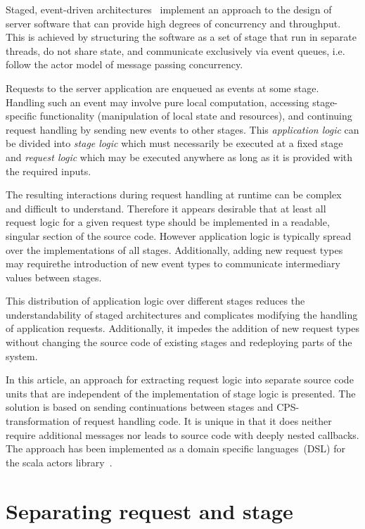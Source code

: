 \documentclass{sig-alternate}
\begin{document}
Staged, event-driven architectures~\cite{Welsh:2009} implement an approach to the design of server
software that can provide high degrees of concurrency and throughput. This is achieved by
structuring the software as a set of stage that run in separate threads, do not share state, and
communicate exclusively via event queues, i.e. follow the actor model of message passing
concurrency.

Requests to the server application are enqueued as events at some stage. Handling such an event may
involve pure local computation, accessing stage-specific functionality (manipulation of local state
and resources), and continuing request handling by sending new events to other stages. This
\emph{application logic} can be divided into \emph{stage logic} which must necessarily be executed
at a fixed stage and \emph{request logic} which may be executed anywhere as long as it is provided
with the required inputs.

The resulting interactions during request handling at runtime can be complex and difficult to
understand. Therefore it appears desirable that at least all request logic for a given request type
should be implemented in a readable, singular section of the source code. However application logic
is typically spread over the implementations of all stages.  Additionally, adding new request types 
may requirethe introduction of new event types to communicate intermediary values between stages.

This distribution of application logic over different stages reduces the understandability of staged
architectures and complicates modifying the handling of application requests. Additionally, it
impedes the addition of new request types without changing the source code of existing stages and
redeploying parts of the system.

In this article, an approach for extracting request logic into separate source code units that are
independent of the implementation of stage logic is presented. The solution is based on sending
continuations between stages and CPS-transformation of request handling code. It is unique
in that it does neither require additional messages nor leads to source code with deeply nested
callbacks. The approach has been implemented as a domain specific languages~(DSL) for the scala
actors library~\cite{Haller:2007}.


\section{Separating request and stage}
\end{document}
